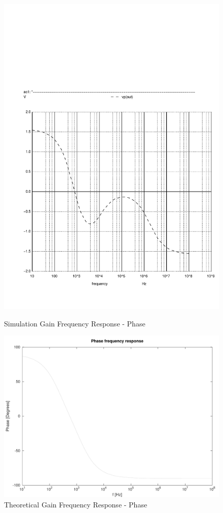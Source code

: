 \begin{figure}[H]
      \includegraphics[width=\linewidth]{../sim/vo1p.pdf}
      \caption{Simulation Gain Frequency Response - Phase}
    \endminipage\hfill
      \includegraphics[width=\linewidth]{../mat/fresponse2.pdf}
      \caption{Theoretical Gain Frequency Response - Phase}
    \endminipage\hfill
\end{figure}



